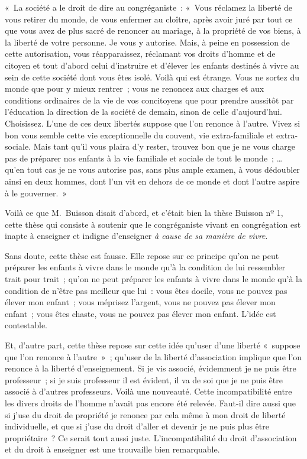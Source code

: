 \documentclass[french,twoside]{book} %
\begin{document}
« La société a le droit de dire au congréganiste : « Vous réclamez la liberté de vous retirer du monde, de vous enfermer au cloître, après avoir juré par tout ce que vous avez de plus sacré de renoncer au mariage, à la propriété de vos biens, à la liberté de votre personne. Je vous y autorise. Mais, à peine en possession de cette autorisation, vous réapparaissez, réclamant vos droits d’homme et de citoyen et tout d’abord celui d’instruire et d’élever les enfants destinés à vivre au sein de cette société dont vous êtes isolé. Voilà qui est étrange. Vous ne sortez du monde que pour y mieux rentrer ; vous ne renoncez aux charges et aux conditions ordinaires de la vie de vos concitoyens que pour prendre aussitôt par l’éducation la direction de la société de demain, sinon de celle d’aujourd’hui. Choisissez. L’une de ces deux libertés suppose que l’on renonce à l’autre. Vivez si bon vous semble cette vie exceptionnelle du couvent, vie extra-familiale et extra-sociale. Mais tant qu’il vous plaira d’y rester, trouvez bon que je ne vous charge pas de préparer nos enfants à la vie familiale et sociale de tout le monde ; … qu’en tout cas je ne vous autorise pas, sans plus ample examen, à vous dédoubler ainsi en deux hommes, dont l’un vit en dehors de ce monde et dont l’autre aspire à le gouverner. »\par
 Voilà ce que M. Buisson disait d’abord, et c’était bien la thèse Buisson nº 1, cette thèse qui consiste à soutenir que le congréganiste vivant en congrégation est inapte à enseigner et indigne d’enseigner {\itshape à cause de sa manière de vivre}.\par
Sans doute, cette thèse est fausse. Elle repose sur ce principe qu’on ne peut préparer les enfants à vivre dans le monde qu’à la condition de lui ressembler trait pour trait ; qu’on ne peut préparer les enfants à vivre dans le monde qu’à la condition de n’être pas meilleur que lui : vous êtes docile, vous ne pouvez pas élever mon enfant ; vous méprisez l’argent, vous ne pouvez pas élever mon enfant ; vous êtes chaste, vous ne pouvez pas élever mon enfant. L’idée est contestable.\par
Et, d’autre part, cette thèse repose sur cette idée qu’user d’une liberté « suppose que l’on renonce à l’autre » ; qu’user de la liberté d’association implique que l’on renonce à la liberté d’enseignement. Si je vis associé, évidemment je ne puis être professeur ; si je suis professeur il est évident, il va de soi que je ne puis être associé à d’autres professeurs. Voilà une nouveauté. Cette incompatibilité entre les divers droits de l’homme n’avait pas encore été relevée. Faut-il dire aussi que si j’use du droit de propriété je renonce par cela même à mon droit de liberté individuelle, et que si j’use du droit  d’aller et devenir je ne puis plus être propriétaire ? Ce serait tout aussi juste. L’incompatibilité du droit d’association et du droit à enseigner est une trouvaille bien remarquable.\par
\end{document}
